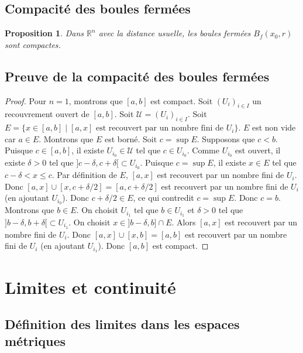 \documentclass{article}
\newtheorem{proposition}{Proposition}
\begin{document}
\subsection{Compacité des boules fermées}

\begin{proposition}
Dans $\mathbb{R}^n$ avec la distance usuelle, les boules fermées $B_f(x_0, r)$ sont compactes.
\end{proposition}

\subsection{Preuve de la compacité des boules fermées}

\begin{proof}
Pour $n=1$, montrons que $[a, b]$ est compact. Soit $(U_i)_{i \in I}$ un recouvrement ouvert de $[a, b]$. Soit $\mathcal{U} = (U_i)_{i \in I}$.
Soit $E = \{x \in [a, b] \mid [a, x] \text{ est recouvert par un nombre fini de } U_i \}$.
$E$ est non vide car $a \in E$. Montrons que $E$ est borné.
Soit $c = \sup E$. Supposons que $c < b$. Puisque $c \in [a, b]$, il existe $U_{i_0} \in \mathcal{U}$ tel que $c \in U_{i_0}$. Comme $U_{i_0}$ est ouvert, il existe $\delta > 0$ tel que $]c - \delta, c + \delta[ \subset U_{i_0}$.
Puisque $c = \sup E$, il existe $x \in E$ tel que $c - \delta < x \leq c$. Par définition de $E$, $[a, x]$ est recouvert par un nombre fini de $U_i$.
Donc $[a, x] \cup [x, c + \delta/2] = [a, c + \delta/2]$ est recouvert par un nombre fini de $U_i$ (en ajoutant $U_{i_0}$). Donc $c + \delta/2 \in E$, ce qui contredit $c = \sup E$. Donc $c = b$.
Montrons que $b \in E$. On choisit $U_{i_1}$ tel que $b \in U_{i_1}$ et $\delta > 0$ tel que $]b - \delta, b + \delta[ \subset U_{i_1}$. On choisit $x \in ]b - \delta, b] \cap E$. Alors $[a, x]$ est recouvert par un nombre fini de $U_i$. Donc $[a, x] \cup [x, b] = [a, b]$ est recouvert par un nombre fini de $U_i$ (en ajoutant $U_{i_1}$). Donc $[a, b]$ est compact.
\end{proof}

\section{Limites et continuité}

\subsection{Définition des limites dans les espaces métriques}
\end{document}
